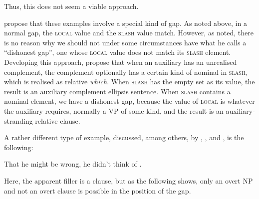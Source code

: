 \documentclass[output=paper
,notxmath 
 	        ,biblatex
                ,babelshorthands
                ,newtxmath
                ,draftmode
                ,colorlinks, citecolor=brown
]{langscibook}
\begin{document}
\begin{exe} \ex \begin{xlist} 

\end{xlist}
\end{exe}
\noindent
\begin{exe} \ex \begin{xlist} 

\end{xlist}
\end{exe}

\noindent
Thus, this does not seem a viable approach.

\citet{Arnold:Borsley:10} propose that these examples involve a special
kind of gap. As noted above, in a normal gap, the \textsc{local} value and the
\textsc{slash} value match. However, as \citet{webelhuth08} noted, there is no
reason why we should not under some circumstances have what he calls a
``dishonest gap'', one whose \textsc{local} value
does not match its  \textsc{slash} element.
Developing this approach, \citet{Arnold:Borsley:10} propose that when an
auxiliary has an unrealised complement, the complement optionally has a
certain kind of nominal in \textsc{slash}, which is realised as
relative \emph{which}. When \textsc{slash} has the empty set as its value, the
result is an auxiliary complement ellipsis sentence. When \textsc{slash} contains a nominal element, we have a dishonest gap, because the value of \textsc{local} is
whatever the auxiliary requires, normally a VP of some kind, and the
result is an auxiliary-stranding relative clause.

A rather different type of example, discussed, among others, by
\citet[Chapter~2]{Bresnan01}, \citet[25--26]{Bouma:Malouf:Sag:01}, and \citet{Webelhuth:12},
is the following:

\begin{exe}
\ex  \label{ex:UDC:ThatHeMightBeWrong}  That he might be wrong, he didn't think of \trace{}.
\end{exe}

\noindent
Here, the apparent filler is a clause, but as the following shows, only
an overt NP and not an overt clause is possible in the position of the
gap.

\begin{exe}
\ex
\begin{xlist}
\end{xlist}
\end{exe}
\end{document}
